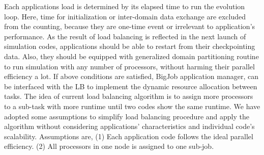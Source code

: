 \documentclass[conference,final]{IEEEtran}
\begin{document}

Each applications load is determined by its elapsed time to run the
evolution loop. Here, time for initialization or inter-domain data
exchange are excluded from the counting, because they are one-time
event or irrelevant to application's performance. As the result of
load balancing is reflected in the next launch of simulation codes,
applications should be able to restart from their checkpointing data.
Also, they should be equipped with generalized domain partitioning
routine to run simulation with any number of processors, without
harming their parallel efficiency a lot. If above conditions are
satisfied, BigJob application manager, can be interfaced with the LB
to implement the dynamic resource allocation between tasks.
The idea of current load balancing algorithm is to assign more processors to a sub-task with more runtime until two codes show the same runtime. We have adopted some assumptions to simplify load balancing procedure and apply the algorithm without considering applications' characteristics and individual code's scalability. Assumptions are, (1) Each application code follows the ideal parallel efficiency.
(2) All processors in one node is assigned to one sub-job.



\end{document}
